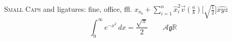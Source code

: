 \textsc{Small Caps} and ligatures: fine, office, ffl.
$x_{a_{b}} + \sum_{i=1}^{n} \hat{x}_i^{2} \vec{v}
\left(\frac{a}{b}\right) \Bigg[ \sqrt{\frac{1}{2}} \Bigg] \widehat{xyz}$
\[ \int_0^\infty e^{-x^2}\,dx = \frac{\sqrt\pi}{2} \qquad \mathcal{A}\mathfrak{g}\mathbb{R} \]
